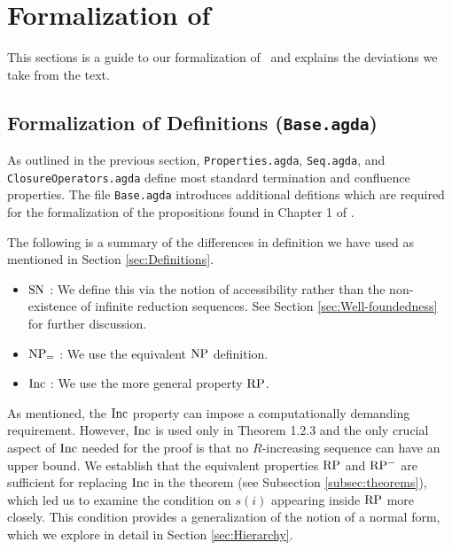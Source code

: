 \section{Formalization of \terese}
\label{sec:Formalization}
This sections is a guide to our formalization of \terese $\,$ and explains the deviations we take from the text.

\subsection{Formalization of Definitions (\texttt{Base.agda})}\label{subsec:def}


As outlined in the previous section, \texttt{Properties.agda}, \texttt{Seq.agda}, and \texttt{ClosureOperators.agda} define most standard termination and confluence properties. The file \texttt{Base.agda} introduces additional defitions which are required for the formalization of the propositions found in Chapter 1 of \terese.





The following is a summary of the differences in definition we have used as mentioned in Section \ref{sec:Definitions}.
\begin{itemize}
    \item $\mathrm{SN}$ : We define this via the notion of accessibility rather than the non-existence of infinite reduction sequences.
     See Section \ref{sec:Well-foundedness} for further discussion.
    \item $\mathrm{NP_=}$ : We use the equivalent $\mathrm{NP}$ definition.
    \item $\mathrm{Inc}$ : We use the more general property $\mathrm{RP}$.
\end{itemize}

As mentioned, the $\mathrm{Inc}$ property can impose a computationally demanding requirement. However, $\mathrm{Inc}$ is used only in Theorem 1.2.3
and the only crucial aspect of $\mathrm{Inc}$ needed for the proof is that no $R$-increasing
sequence can have an upper bound.
We establish that the equivalent properties $\mathrm{RP}$ and $\mathrm{RP^{-}}$ are sufficient for replacing $\mathrm{Inc}$ in the theorem (see Subsection \ref{subsec:theorems}),
which led us to examine the condition on $s (i)$ appearing inside $\mathrm{RP}$ more closely. This condition provides a generalization of the notion of a normal form,
which we explore in detail in Section \ref{sec:Hierarchy}.

